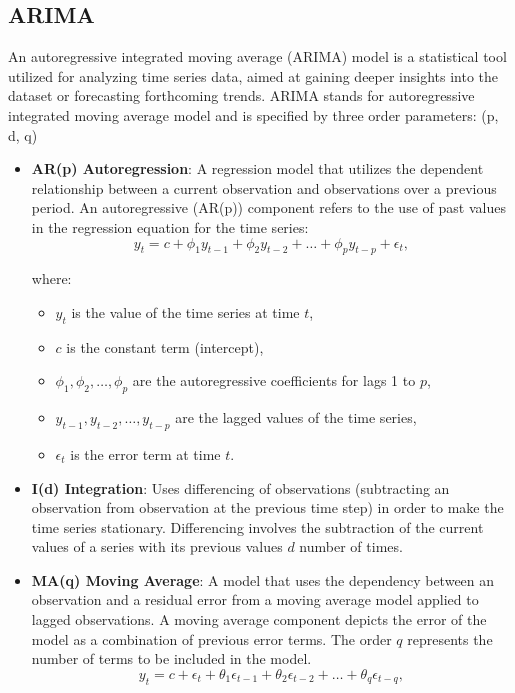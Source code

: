 \documentclass{ieeeojies}
\begin{document}
\subsection{ARIMA}
An autoregressive integrated moving average (ARIMA) model is a statistical tool utilized for analyzing time series data, aimed at gaining deeper insights into the dataset or forecasting forthcoming trends.
ARIMA stands for autoregressive integrated moving average model and is specified by three order parameters: (p, d, q)
\begin{itemize}
    \item \textbf{AR(p) Autoregression}: A regression model that utilizes the dependent relationship between a current observation and observations over a previous period. An autoregressive (AR(p)) component refers to the use of past values in the regression equation for the time series:
    \begin{equation}
y_t = c + \phi_1 y_{t-1} + \phi_2 y_{t-2} + \ldots + \phi_p y_{t-p} + \epsilon_t,
\end{equation}

where:
\begin{itemize}
    \item \( y_t \) is the value of the time series at time \( t \),
    \item \( c \) is the constant term (intercept),
    \item \( \phi_1, \phi_2, \ldots, \phi_p \) are the autoregressive coefficients for lags 1 to \( p \),
    \item \( y_{t-1}, y_{t-2}, \ldots, y_{t-p} \) are the lagged values of the time series,
    \item \( \epsilon_t \) is the error term at time \( t \).
\end{itemize}
    
    \item \textbf{I(d) Integration}: Uses differencing of observations (subtracting an observation from observation at the previous time step) in order to make the time series stationary. Differencing involves the subtraction of the current values of a series with its previous values \( d \) number of times.
    
    \item \textbf{MA(q) Moving Average}: A model that uses the dependency between an observation and a residual error from a moving average model applied to lagged observations. A moving average component depicts the error of the model as a combination of previous error terms. The order \( q \) represents the number of terms to be included in the model.
    \begin{equation}
y_t = c + \epsilon_t + \theta_1 \epsilon_{t-1} + \theta_2 \epsilon_{t-2} + \ldots + \theta_q \epsilon_{t-q},
\end{equation}


\end{itemize}
\end{document}
